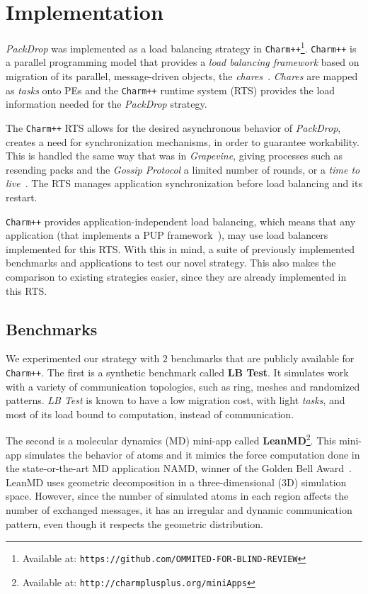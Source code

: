 \section{Implementation}

\textit{PackDrop} was implemented as a load balancing strategy in \texttt{Charm++}\footnote{Available at: \texttt{https://github.com/OMMITED-FOR-BLIND-REVIEW}}.
\texttt{Charm++} is a parallel programming model that provides a \textit{load balancing framework} based on migration of its parallel, message-driven objects, the \textit{chares}~\cite{CharmLOTR}.
\textit{Chares} are mapped as \textit{tasks} onto PEs and the \texttt{Charm++} runtime system (RTS) provides the load information needed for the \textit{PackDrop} strategy.

The \texttt{Charm++} RTS allows for the desired asynchronous behavior of \textit{PackDrop}, creates a need for synchronization mechanisms, in order to guarantee workability.
This is handled the same way that was in \textit{Grapevine}, giving processes such as resending packs and the \textit{Gossip Protocol} a limited number of rounds, or a \textit{time to live}~\cite{grapevine}.
The RTS manages application synchronization before load balancing and its restart.

\texttt{Charm++} provides application-independent load balancing, which means that any application (that implements a PUP framework~\cite{sc14charm}), may use load balancers implemented for this RTS.
With this in mind, a suite of previously implemented benchmarks and applications to test our novel strategy.
This also makes the comparison to existing strategies easier, since they are already implemented in this RTS.

\subsection{Benchmarks}

We experimented our strategy with $2$ benchmarks that are publicly available for \texttt{Charm++}.
The first is a synthetic benchmark called \textbf{LB Test}. 
It simulates work with a variety of communication topologies, such as ring, meshes and randomized patterns.
\textit{LB Test} is known to have a low migration cost, with light \textit{tasks}, and most of its load bound to computation, instead of communication.

The second is a molecular dynamics (MD) mini-app called \textbf{LeanMD}\footnote{Available at: \tt{http://charmplusplus.org/miniApps}}.
This mini-app simulates the behavior of atoms and it mimics the force computation done in the state-or-the-art MD application NAMD, winner of the Golden Bell Award~\cite{grapevine}.
LeanMD uses geometric decomposition in a three-dimensional ($3$D) simulation space.
However, since the number of simulated atoms in each region affects the number of exchanged messages, it has an irregular and dynamic communication pattern, even though it respects the geometric distribution.

